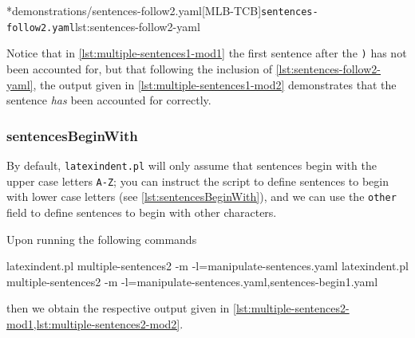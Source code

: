 	\begin{minipage}{.55\linewidth}
	\end{minipage}
	\hfill
	\begin{minipage}{.45\linewidth}
		\cmhlistingsfromfile[style=yaml-LST]*{demonstrations/sentences-follow2.yaml}[MLB-TCB]{\texttt{sentences-follow2.yaml}}{lst:sentences-follow2-yaml}
	\end{minipage}

	Notice that in \cref{lst:multiple-sentences1-mod1} the first sentence after the
	\texttt{)} has not been accounted for, but that following the inclusion
	of \cref{lst:sentences-follow2-yaml}, the output given in \cref{lst:multiple-sentences1-mod2}
	demonstrates that the sentence \emph{has} been accounted for correctly.

\subsubsection{sentencesBeginWith}
	By default, \texttt{latexindent.pl} will only assume that sentences begin with the
	upper case letters \texttt{A-Z}; you can instruct the script to define
	sentences to begin with lower case letters (see \cref{lst:sentencesBeginWith}), and we can
	use the \texttt{other} field to define sentences to begin with other
	characters.


	Upon running the following commands
	\begin{widepage}
		\begin{commandshell}
latexindent.pl multiple-sentences2 -m -l=manipulate-sentences.yaml
latexindent.pl multiple-sentences2 -m -l=manipulate-sentences.yaml,sentences-begin1.yaml
	\end{commandshell}
	\end{widepage}
	then we obtain the respective output given in \cref{lst:multiple-sentences2-mod1,lst:multiple-sentences2-mod2}.

